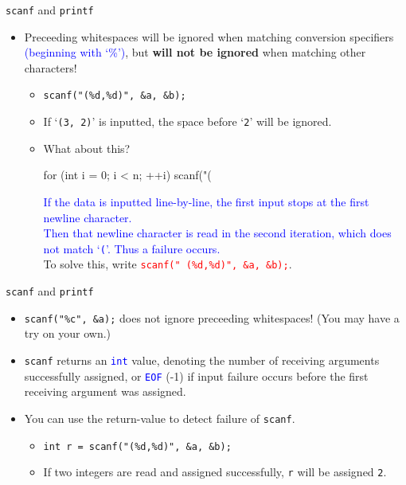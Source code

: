 \documentclass[handout]{beamer}
\newcommand{\red}[1]{\textcolor{red}{#1}}
\newcommand{\blue}[1]{\textcolor{blue}{#1}}
\newcommand{\ttt}[1]{\texttt{#1}}
\newcommand{\bluett}[1]{\blue{\ttt{#1}}}
\newcommand{\redtt}[1]{\red{\ttt{#1}}}
\begin{document}
\begin{frame}[fragile]{\ttt{scanf} and \ttt{printf}}
    \begin{itemize}
        \item Preceeding whitespaces will be ignored when matching conversion specifiers \blue{(beginning with `\%')}, but \textbf{will not be ignored} when matching other characters!
        \begin{itemize}
            \item \ttt{scanf("(\%d,\%d)", \&a, \&b);}
            \item If `\ttt{(3, 2)}' is inputted, the space before `\ttt{2}' will be ignored.
            \pause
            \item What about this?
            \begin{cpp}
for (int i = 0; i < n; ++i)
    scanf("(%
            \end{cpp}
            \pause
            \blue{If the data is inputted line-by-line, the first input stops at the first newline character.}\\
            \blue{Then that newline character is read in the second iteration, which does not match `\ttt{(}'. Thus a failure occurs.}\\
            \pause
            To solve this, write \redtt{scanf(" (\%d,\%d)", \&a, \&b);}.
        \end{itemize}
    \end{itemize}
\end{frame}

\begin{frame}{\ttt{scanf} and \ttt{printf}}
    \begin{itemize}
        \item \ttt{scanf("\%c", \&a);} does not ignore preceeding whitespaces! (You may have a try on your own.)
        \pause
        \item \ttt{scanf} returns an \bluett{int} value, denoting the number of receiving arguments successfully assigned, or \bluett{EOF} (-1) if input failure occurs before the first receiving argument was assigned.
        \item You can use the return-value to detect failure of \ttt{scanf}.
        \begin{itemize}
            \item \ttt{int r = scanf("(\%d,\%d)", \&a, \&b);}
            \item If two integers are read and assigned successfully, \ttt{r} will be assigned \ttt{2}.
        \end{itemize}
    \end{itemize}
\end{frame}
\end{document}
